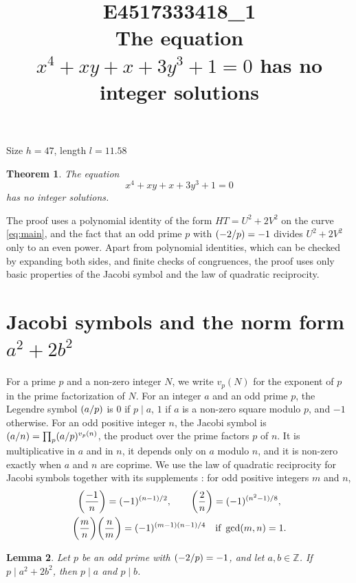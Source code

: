 \documentclass[11pt]{article}
\title{\textbf{E4517333418\_1}\\[4pt] {\Large The equation $x^{4}+xy+x+3y^{3}+1=0$ has no integer solutions}}
\author{}
\date{}
\newtheorem{theorem}{Theorem}
\newtheorem{lemma}[theorem]{Lemma}
\newcommand{\Z}{\mathbb{Z}}
\newcommand{\leg}[2]{\mathchoice{\biggl(\dfrac{#1}{#2}\biggr)}{(#1/#2)}{(#1/#2)}{(#1/#2)}}
\begin{document}
\maketitle
\vspace{-8ex}
\begin{center}
Size $h=47$, length $l=11.58$
\end{center}

\begin{theorem}\label{thm:main}
The equation
\begin{equation}\label{eq:main}
x^{4}+xy+x+3y^{3}+1=0
\end{equation}
has no integer solutions.
\end{theorem}

The proof uses a polynomial identity of the form $HT=U^2+2V^2$ on the curve \eqref{eq:main}, and the fact that an odd prime $p$ with $\leg{-2}{p}=-1$ divides $U^2+2V^2$ only to an even power. Apart from polynomial identities, which can be checked by expanding both sides, and finite checks of congruences, the proof uses only basic properties of the Jacobi symbol and the law of quadratic reciprocity.

\section{\texorpdfstring{Jacobi symbols and the norm form $a^2+2b^2$}{Jacobi symbols and the norm form}}

For a prime $p$ and a non-zero integer $N$, we write $v_p(N)$ for the exponent of $p$ in the prime factorization of $N$. For an integer $a$ and an odd prime $p$, the Legendre symbol $\leg{a}{p}$ is $0$ if $p\mid a$, $1$ if $a$ is a non-zero square modulo $p$, and $-1$ otherwise. For an odd positive integer $n$, the Jacobi symbol is $\leg{a}{n}=\prod_p\leg{a}{p}^{v_p(n)}$, the product over the prime factors $p$ of $n$. It is multiplicative in $a$ and in $n$, it depends only on $a$ modulo $n$, and it is non-zero exactly when $a$ and $n$ are coprime. We use the law of quadratic reciprocity for Jacobi symbols together with its supplements \cite[Chapter~5, \S2]{IR}: for odd positive integers $m$ and $n$,
\begin{gather*}
\leg{-1}{n}=(-1)^{(n-1)/2},\qquad\leg{2}{n}=(-1)^{(n^2-1)/8},\\
\leg{m}{n}\leg{n}{m}=(-1)^{(m-1)(n-1)/4}\quad\text{if }\gcd(m,n)=1.
\end{gather*}

\begin{lemma}\label{lem:divides}
Let $p$ be an odd prime with $\leg{-2}{p}=-1$, and let $a,b\in\Z$. If $p\mid a^2+2b^2$, then $p\mid a$ and $p\mid b$.
\end{lemma}
\end{document}
